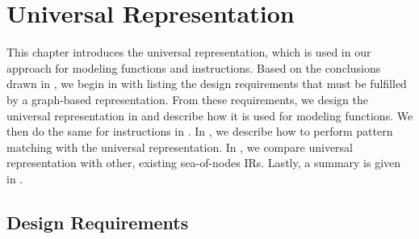 %

\chapter{Universal Representation}

This chapter introduces the \gls{universal representation}, which is used in our
approach for modeling \glspl{function} and \glspl{instruction}.
%
Based on the conclusions drawn in
, we begin in
 with listing the design requirements
that must be fulfilled by a graph-based representation.
%
From these requirements, we design the \gls{universal representation} in
 and describe how it is used for modeling
\glspl{function}.
%
We then do the same for \glspl{instruction} in .
%
In , we describe how to perform
\gls{pattern matching} with the \gls{universal representation}.
%
In , we compare \gls{universal representation}
with other, existing \glspl{sea-of-nodes IR}.
%
Lastly, a summary is given in .


\section{Design Requirements}

